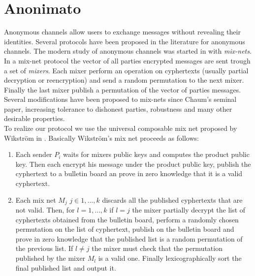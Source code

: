\chapter{Anonimato} \label{sect:AC}
Anonymous channels allow users to exchange messages without revealing their identities. Several protocols
have been proposed in the literature for anonymous channels. The modern study of anonymous channels was
started in \cite{journals/cacm/Chaum81} with \textit{mix-nets}. In a mix-net protocol the vector of all
parties encrypted messages are sent trough a set of \textit{mixers}. Each mixer perform an operation on cyphertexts
(usually partial decryption or reencryption) and send a random permutation to the next mixer. Finally the
last mixer publish a permutation of the vector of parties messages. Several modifications have been proposed
to mix-nets since Chaum's seminal paper, increasing tolerance to dishonest parties, robustness and many other
desirable properties.\\
To realize our protocol we use the universal composable mix net proposed by Wikstr\"om in \cite{Wikstrom04a}.
Basically Wikstr\"om's mix net proceeds as follows:

\begin{enumerate}

\item Each sender $P_i$ waits for mixers public keys and computes the product public key.
      Then each encrypt his message under the product public key, publish the cyphertext
      to a bulletin board an prove in zero knowledge that it is a valid cyphertext.
\item Each mix net $M_j$ $j\in{1, \ldots, k}$ discards all the published cyphertexts that
      are not valid. Then, for $l = 1, \ldots, k$ if $l = j$ the mixer partially decrypt
      the list of cyphertexts obtained from the bulletin board, perform a randomly chosen
      permutation on the list of cyphertext, publish on the bulletin board and prove in
      zero knowledge that the published list is a random permutation of the previous list.
      If $l \neq j$ the mixer must check that the permutation published by the mixer $M_l$
      is a valid one. Finally lexicographically sort the final published list and output it.

\end{enumerate}


